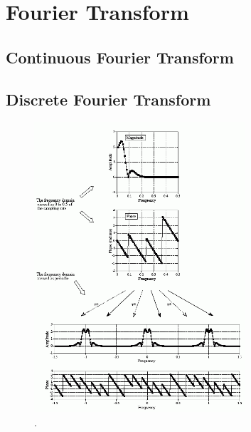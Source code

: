 \documentclass[a4paper,12pt]{article}
\begin{document}


\section{Fourier Transform}

\subsection{Continuous Fourier Transform}

\subsection{Discrete Fourier Transform}
\begin{figure}[ht]
  \label{fig:F_10_9}
  \centering
	\includegraphics[width=0.7\textwidth, keepaspectratio=true]{F_10_9}
	\caption{.}
\end{figure}
\end{document}
